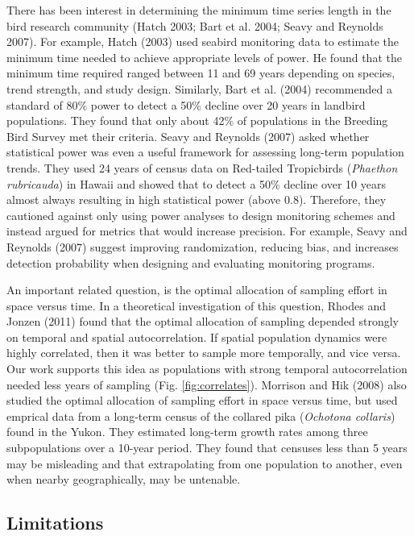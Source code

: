 \documentclass[12pt,]{article}
\begin{document}
There has been interest in determining the minimum time series length in
the bird research community (Hatch 2003; Bart et al. 2004; Seavy and
Reynolds 2007). For example, Hatch (2003) used seabird monitoring data
to estimate the minimum time needed to achieve appropriate levels of
power. He found that the minimum time required ranged between 11 and 69
years depending on species, trend strength, and study design. Similarly,
Bart et al. (2004) recommended a standard of 80\% power to detect a 50\%
decline over 20 years in landbird populations. They found that only
about 42\% of populations in the Breeding Bird Survey met their
criteria. Seavy and Reynolds (2007) asked whether statistical power was
even a useful framework for assessing long-term population trends. They
used 24 years of census data on Red-tailed Tropicbirds
(\emph{Phaethon rubricauda}) in Hawaii and showed that to detect a 50\%
decline over 10 years almost always resulting in high statistical power
(above 0.8). Therefore, they cautioned against only using power analyses
to design monitoring schemes and instead argued for metrics that would
increase precision. For example, Seavy and Reynolds (2007) suggest
improving randomization, reducing bias, and increases detection
probability when designing and evaluating monitoring programs.

An important related question, is the optimal allocation of sampling
effort in space versus time. In a theoretical investigation of this
question, Rhodes and Jonzen (2011) found that the optimal allocation of
sampling depended strongly on temporal and spatial autocorrelation. If
spatial population dynamics were highly correlated, then it was better
to sample more temporally, and vice versa. Our work supports this idea
as populations with strong temporal autocorrelation needed less years of
sampling (Fig. \ref{fig:correlates}). Morrison and Hik (2008) also
studied the optimal allocation of sampling effort in space versus time,
but used emprical data from a long-term census of the collared pika
(\emph{Ochotona collaris}) found in the Yukon. They estimated long-term
growth rates among three subpopulations over a 10-year period. They
found that censuses less than 5 years may be misleading and that
extrapolating from one population to another, even when nearby
geographically, may be untenable.

\subsection{Limitations}\label{limitations}
\end{document}
